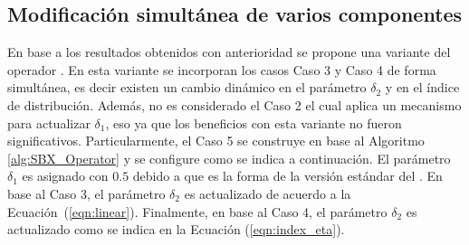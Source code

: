 \subsection{Modificación simultánea de varios componentes}

En base a los resultados obtenidos con anterioridad se propone una variante del operador \SBX{}.
%
En esta variante se incorporan los casos Caso 3 y Caso 4 de forma simultánea, es decir existen un cambio dinámico en el parámetro $\delta_2$ y en el índice de distribución.
%
Además, no es considerado el Caso 2 el cual aplica un mecanismo para actualizar $\delta_1$, eso ya que los beneficios con esta variante no fueron significativos.
%
Particularmente, el Caso 5 se construye en base al Algoritmo \ref{alg:SBX_Operator} y se configure como se indica a continuación.
%
El parámetro $\delta_1$ es asignado con $0.5$ debido a que es la forma de la versión estándar del \SBX{}.
%
En base al Caso 3, el parámetro $\delta_2$ es actualizado de acuerdo a la Ecuación~(\ref{eqn:linear}).
%
Finalmente, en base al Caso 4, el parámetro $\delta_2$ es actualizado como se indica en la Ecuación (\ref{eqn:index_eta}).

